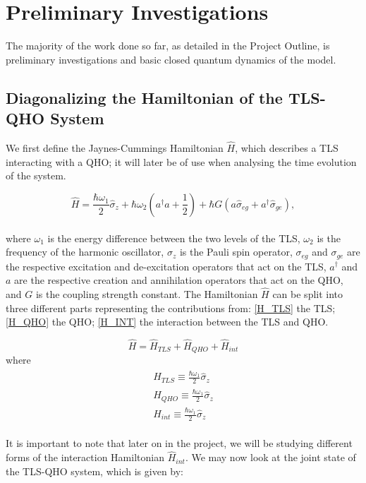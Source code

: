 \documentclass[12pt,a4paper]{article}
\begin{document}
{\section{Preliminary Investigations}}
The majority of the work done so far, as detailed in the Project Outline, is preliminary investigations and basic closed quantum dynamics of the model. 
\\
\subsection{\normalsize{Diagonalizing the Hamiltonian of the TLS-QHO System}}

We first define the Jaynes-Cummings\cite{H_JC} Hamiltonian\cite{C_spin-boson} $\hat{H}$, which describes a TLS interacting with a QHO; it will later be of use when analysing the time evolution of the system. 

\begin{equation}
    \hat{H} = \frac{\hbar\omega_1}{2}\hat{\sigma}_z + \hbar\omega_2(a^\dagger a + \frac{1}{2}) + \hbar G(a\hat{\sigma}_{eg} + a^\dagger\hat{\sigma}_{ge}),
\end{equation}
\\
where $\omega_1$ is the energy difference between the two levels of the TLS, $\omega_2$ is the frequency of the harmonic oscillator, $\sigma_z$ is the Pauli spin operator, $\sigma_{eg}$ and $\sigma_{ge}$ are the respective excitation and de-excitation operators that act on the TLS, $a^\dagger$ and $a$ are the respective creation and annihilation operators that act on the QHO, and $G$ is the coupling strength constant. The Hamiltonian $\hat{H}$ can be split into three different parts representing the contributions from: \eqref{H_TLS} the TLS; \eqref{H_QHO} the QHO; \eqref{H_INT} the interaction between the TLS and QHO. 

\begin{equation*}
    \hat{H} = \hat{H}_{TLS} + \hat{H}_{QHO} + \hat{H}_{int}
\end{equation*}
where 
\begin{align}
    \hat{H}_{TLS}\equiv \frac{\hbar\omega_1}{2}\hat{\sigma}_z \label{H_TLS}\\
    \hat{H}_{QHO}\equiv \frac{\hbar\omega_1}{2}\hat{\sigma}_z \label{H_QHO}\\
    \hat{H}_{int}\equiv \frac{\hbar\omega_1}{2}\hat{\sigma}_z \label{H_INT}
\end{align}
\\
It is important to note that later on in the project, we will be studying different forms of the interaction Hamiltonian $\hat{H}_{int}$.
We may now look at the joint state of the TLS-QHO system, which is given by:
\end{document}

